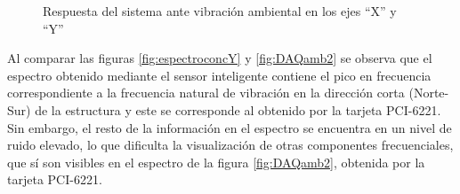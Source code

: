 \begin{figure}[H]
    \centering
    \hfill
    \caption{Respuesta del sistema ante vibración ambiental en los ejes ``X'' y ``Y''}
    \label{fig:espectrosxy}
\end{figure}


Al comparar las figuras \ref{fig:espectroconcY} y \ref{fig:DAQamb2} se observa que el espectro obtenido mediante el sensor inteligente contiene el pico en frecuencia correspondiente a la frecuencia natural de vibración en la dirección corta (Norte-Sur) de la estructura y este se corresponde al obtenido por la tarjeta PCI-6221. Sin embargo, el resto de la información en el espectro se encuentra en un nivel de ruido elevado, lo que dificulta la visualización de otras componentes frecuenciales, que sí son visibles en el espectro de la figura \ref{fig:DAQamb2}, obtenida por la tarjeta PCI-6221.

